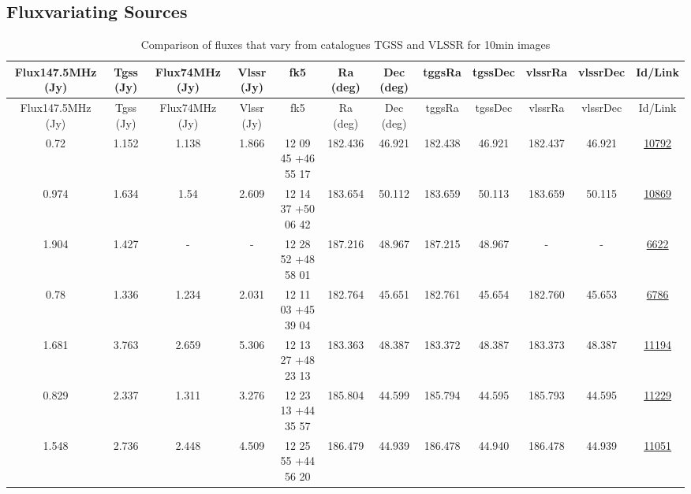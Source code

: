 \documentclass{article}
\begin{document}
\begin{landscape}

\section{Fluxvariating Sources}\label{varsection:KmeulenTrap4P23:10min}

\begin{longtable}{c|c|c|c|c|c|c|c|c|c|c|c} 
\toprule 
Flux147.5MHz (Jy) & Tgss (Jy) & Flux74MHz (Jy)& Vlssr (Jy) & fk5 & Ra (deg) & Dec (deg) &tggsRa&tgssDec&vlssrRa&vlssrDec& Id/Link \\\midrule 
\endfirsthead 
\toprule 
Flux147.5MHz (Jy) & Tgss (Jy) & Flux74MHz (Jy)& Vlssr (Jy)& fk5 & Ra (deg) & Dec (deg)  &tggsRa&tgssDec&vlssrRa&vlssrDec& Id/Link \\\midrule 
\endhead 
\bottomrule 
\endfoot 
\bottomrule
\caption{ Comparison of fluxes that vary from catalogues TGSS and VLSSR for 10min images} 
\endlastfoot
\label{KmeulenTrap4P23:10min:tablevar}
0.72 & 1.152 & 1.138 & 1.866 & 12 09 45 +46 55 17 &  182.436 & 46.921 &  182.438 & 46.921 & 182.437 & 46.921 & \href{http://banana.transientskp.org/r4/vlo_KmeulenTrap4P23/runningcatalog/10792}{10792}  \\
0.974 & 1.634 & 1.54 & 2.609 & 12 14 37 +50 06 42 &  183.654 & 50.112 &  183.659 & 50.113 & 183.659 & 50.115 & \href{http://banana.transientskp.org/r4/vlo_KmeulenTrap4P23/runningcatalog/10869}{10869}  \\
1.904 & 1.427 & - & - & 12 28 52 +48 58 01 &  187.216 & 48.967 &  187.215 & 48.967 & - & - & \href{http://banana.transientskp.org/r4/vlo_KmeulenTrap4P23/runningcatalog/6622}{6622}  \\
0.78 & 1.336 & 1.234 & 2.031 & 12 11 03 +45 39 04 &  182.764 & 45.651 &  182.761 & 45.654 & 182.760 & 45.653 & \href{http://banana.transientskp.org/r4/vlo_KmeulenTrap4P23/runningcatalog/6786}{6786}  \\
1.681 & 3.763 & 2.659 & 5.306 & 12 13 27 +48 23 13 &  183.363 & 48.387 &  183.372 & 48.387 & 183.373 & 48.387 & \href{http://banana.transientskp.org/r4/vlo_KmeulenTrap4P23/runningcatalog/11194}{11194}  \\
0.829 & 2.337 & 1.311 & 3.276 & 12 23 13 +44 35 57 &  185.804 & 44.599 &  185.794 & 44.595 & 185.793 & 44.595 & \href{http://banana.transientskp.org/r4/vlo_KmeulenTrap4P23/runningcatalog/11229}{11229}  \\
1.548 & 2.736 & 2.448 & 4.509 & 12 25 55 +44 56 20 &  186.479 & 44.939 &  186.478 & 44.940 & 186.478 & 44.939 & \href{http://banana.transientskp.org/r4/vlo_KmeulenTrap4P23/runningcatalog/11051}{11051}  \\

\end{longtable}
\end{landscape}
\end{document}
